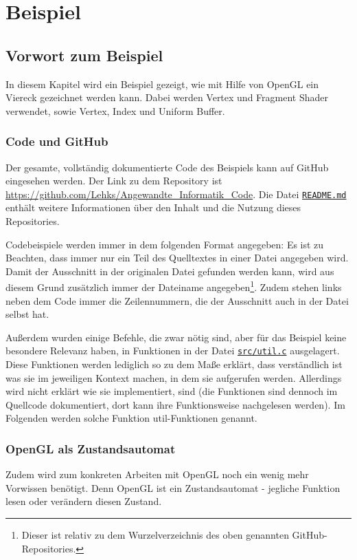 \section{Beispiel}
\subsection{Vorwort zum Beispiel}

In diesem Kapitel wird ein Beispiel gezeigt, wie mit Hilfe von OpenGL ein Viereck gezeichnet werden kann. Dabei werden Vertex und Fragment Shader verwendet, sowie Vertex, Index und Uniform Buffer.

\subsubsection{Code und GitHub}
Der gesamte, vollständig dokumentierte Code des Beispiels kann auf GitHub eingesehen werden. Der Link zu dem Repository ist \url{https://github.com/Lehks/Angewandte_Informatik_Code}. Die Datei \texttt{\href{https://github.com/Lehks/Angewandte_Informatik_Code/blob/master/README.md}{README.md}} enthält weitere Informationen über den Inhalt und die Nutzung dieses Repositories.

Codebeispiele werden immer in dem folgenden Format angegeben:
Es ist zu Beachten, dass immer nur ein Teil des Quelltextes in einer Datei angegeben wird. Damit der Ausschnitt in der originalen Datei gefunden werden kann, wird aus diesem Grund zusätzlich immer der Dateiname angegeben\footnote{Dieser ist relativ zu dem Wurzelverzeichnis des oben genannten GitHub-Repositories.}. Zudem stehen links neben dem Code immer die Zeilennummern, die der Ausschnitt auch in der Datei selbst hat.

Außerdem wurden einige Befehle, die zwar nötig sind, aber für das Beispiel keine besondere Relevanz haben, in Funktionen in der Datei \texttt{\href{https://github.com/Lehks/Angewandte_Informatik_Code/blob/master/src/util.c}{src/util.c}} ausgelagert. Diese Funktionen werden lediglich so zu dem Maße erklärt, dass verständlich ist was sie im jeweiligen Kontext machen, in dem sie aufgerufen werden. Allerdings wird nicht erklärt wie sie implementiert, sind (die Funktionen sind dennoch im Quellcode dokumentiert, dort kann ihre Funktionsweise nachgelesen werden). Im Folgenden werden solche Funktion util-Funktionen genannt.

\subsubsection{OpenGL als Zustandsautomat}
Zudem wird zum konkreten Arbeiten mit OpenGL noch ein wenig mehr Vorwissen benötigt. Denn OpenGL ist ein Zustandsautomat - jegliche Funktion lesen oder verändern diesen Zustand\cite{gl_state_machine}. 

